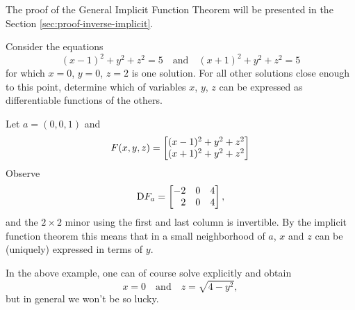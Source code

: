     The proof of  the General Implicit Function Theorem will be presented in the Section \ref{sec:proof-inverse-implicit}.

  

  \begin{exa}
    Consider the equations
    \begin{equation*}
      (x-1)^2 + y^2 + z^2 = 5
      \quad\text{and}\quad
      (x+1)^2 + y^2 + z^2 = 5
    \end{equation*}
    for which $x = 0$, $y = 0$, $z = 2$ is one solution.
    For all other solutions close enough to this point, determine which of variables $x$, $y$, $z$ can be expressed as differentiable functions of the others.
  \end{exa}
\begin{solu}    Let $a = (0, 0, 1)$ and
    \begin{equation*}
      F(x, y, z) = \begin{bmatrix} 
	(x-1)^2 + y^2 + z^2\\
	(x+1)^2 + y^2 + z^2 \end{bmatrix}
    \end{equation*}
    Observe
    \begin{equation*}
      {\mathrm{D}} F_a = \begin{bmatrix} -2 & 0 & 4\\\phantom{-}2 & 0 & 4 \end{bmatrix},
    \end{equation*}
    and the $2 \times 2$ minor using the first and last column is invertible.
    By the implicit function theorem this means that in a small neighborhood of $a$, $x$ and $z$ can be (uniquely) expressed in terms of $y$.
  \end{solu}

  \begin{remark}
    In the above example, one can of course solve explicitly and obtain
    \begin{equation*}
      x = 0
      \quad\text{and}\quad
      z = \sqrt{4 - y^2},
    \end{equation*}
    but in general we won't be so lucky.
  \end{remark}
  



